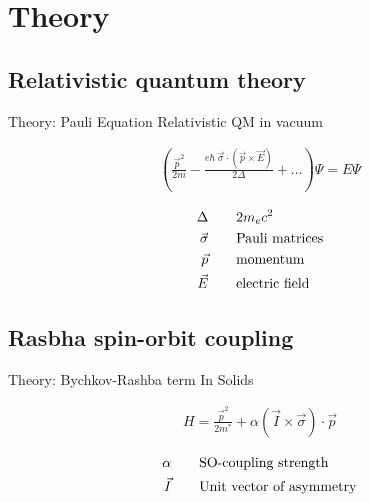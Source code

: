 \documentclass{beamer}
\begin{document}
\section{Theory}
\subsection{Relativistic quantum theory}
\begin{frame}{Theory: Pauli Equation}
    Relativistic QM in vacuum

    \begin{align*}
        \left( \frac{\vec p^2}{2m}- \frac{e\hbar \ \vec\sigma \cdot (\vec p \times \vec E)}
                        {2\Delta} +\ldots\right)\Psi = E \Psi
    \end{align*}

    \begin{align*}
        \Delta\qquad       & 2m_e c^2\\
        \vec \sigma \qquad & \textnormal{Pauli matrices}\\
        \vec p      \qquad & \textnormal{momentum}\\
        \vec E      \qquad & \textnormal{electric field}\\
    \end{align*}

\end{frame}

\subsection{Rasbha spin-orbit coupling}

\begin{frame}{Theory:  Bychkov-Rashba term}
    In Solids

    \begin{align*}
        H = \frac{\vec p^2}{2 m^*} + \alpha (\vec I \times \vec \sigma) \cdot
        \vec p
    \end{align*}

    \begin{align*}
        \alpha  \qquad & \textnormal{SO-coupling strength}\\
        \vec I  \qquad & \textnormal{Unit vector of asymmetry}
    \end{align*}

\end{frame}
\end{document}
